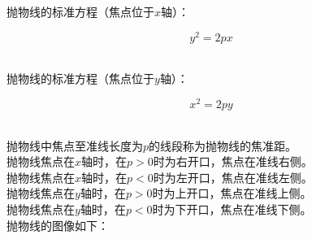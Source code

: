 \documentclass[UTF8]{ctexart}
\begin{document}
    抛物线的标准方程（焦点位于$x$轴）：
    \begin{large}
        \begin{equation*}
            y^2=2px
        \end{equation*}
    \end{large}\\
    抛物线的标准方程（焦点位于$y$轴）：
    \begin{large}
        \begin{equation*}
            x^2=2py
        \end{equation*}
    \end{large}\\
    抛物线中焦点至准线长度为$p$的线段称为抛物线的焦准距。\\[3mm]
    抛物线焦点在$x$轴时，在$p>0$时为右开口，焦点在准线右侧。\\[3mm]
    抛物线焦点在$x$轴时，在$p<0$时为左开口，焦点在准线左侧。\\[3mm]
    抛物线焦点在$y$轴时，在$p>0$时为上开口，焦点在准线上侧。\\[3mm]
    抛物线焦点在$y$轴时，在$p<0$时为下开口，焦点在准线下侧。\\[5mm]
    抛物线的图像如下：
\end{document}
